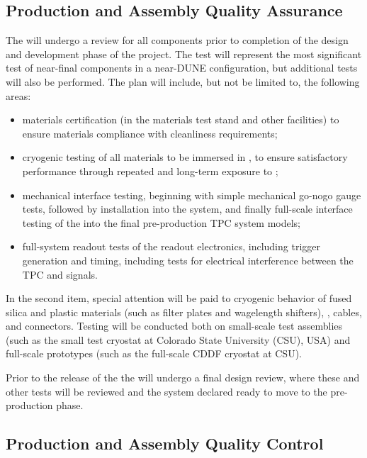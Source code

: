 \subsection{Production and Assembly Quality Assurance}
\label{sec:fdsp-pd-prodqa}

The  will undergo a  review for all components prior to completion of the design and development phase of the project.  The  test will represent the most significant test of near-final  components in a near-DUNE configuration, but additional tests will also be performed.  The  plan will include, but not be limited to, the following areas:

\begin{itemize}
\item materials certification (in the  materials test stand and other facilities) to ensure materials compliance with cleanliness requirements;
\item cryogenic testing of all materials to be immersed in \lar, to ensure satisfactory performance through repeated and long-term exposure to \lar{};   
\item mechanical interface testing, beginning with simple mechanical go-nogo gauge tests, followed by installation into the  system, and finally full-scale interface testing of the  into the final pre-production TPC system models;
\item full-system readout tests of the  readout electronics, including trigger generation and timing, including tests for electrical interference between the TPC and  signals.
\end{itemize}

In the second item, special attention will be paid to cryogenic behavior of fused silica and plastic materials (such as filter plates and wagelength shifters), , cables, and connectors.  Testing will be conducted both on small-scale test assemblies (such as the small test cryostat at Colorado State University (CSU), USA) and full-scale prototypes (such as the full-scale CDDF cryostat at CSU). 

Prior to the release of the  the  will undergo a final design review, where these and other  tests will be reviewed and the system declared ready to move to the pre-production phase.


\subsection{Production and Assembly Quality Control}
\label{sec:fdsp-pd-prodqc}

